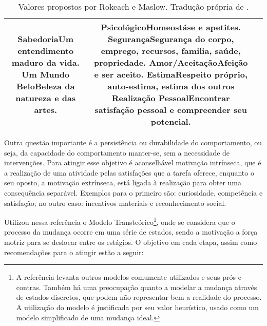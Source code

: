 \begin{table}[h!t]
{\begin{tabular}{ccc}
{\textbf{Sabedoria}\newline Um entendimento maduro da vida. \newline
\textbf{Um Mundo Belo}\newline Beleza da natureza e das artes.
} &
\multicolumn{1}{m{6cm}|}{
\textbf{Psicológico}\newline Homeostáse e apetites. \newline
\textbf{Segurança}\newline Segurança do corpo, emprego, recursos, familia, saúde,
propriedade. \newline
\textbf{Amor/Aceitação}\newline Afeição e ser aceito. \newline
\textbf{Estima}\newline Respeito próprio, auto-estima, estima dos outros \newline
\textbf{Realização Pessoal}\newline Encontrar satisfação pessoal e compreender seu
potencial.
} \\
\hline 
\end{tabular}
}
\caption[Valores propostos por Rokeach e Maslow.]
{Valores propostos por Rokeach e Maslow. Tradução própria de 
\cite[p.928]{2010_aspectos_psicologicos_usa}.}
\label{tab:valores}
\end{table}

Outra questão importante é a persistência ou durabilidade do
comportamento, ou seja, da capacidade do comportamento manter-se, sem
a necessidade de intervenções.  Para atingir esse objetivo é
aconselhável motivação intrínseca, que é a realização de uma atividade
pelas satisfações que a tarefa oferece, enquanto o seu oposto, a
motivação extrínseca, está ligada à realização para obter uma
consequência separável. Exemplos para o primeiro são: curiosidade,
competência e satisfação; no outro caso: incentivos materiais e
reconhecimento social.

Utilizou nessa referência o Modelo Transteórico\footnote{A referência
levanta outros modelos comumente utilizados e seus prós e contras.
Também há uma preocupação quanto a modelar a mudança através de
estados discretos, que podem não representar bem a realidade do
processo. A utilização do modelo é justificada por seu valor
heurístico, usado como um modelo simplificado de uma mudança ideal.},
onde se considera que o processo da mudança ocorre em uma série de
estados, sendo a motivação a força motriz para se deslocar entre os
estágios. O objetivo em cada etapa, assim como recomendações para o
atingir estão a seguir:

